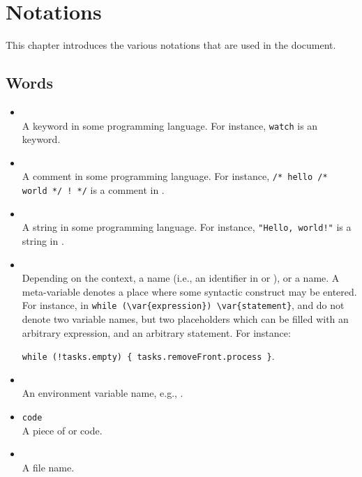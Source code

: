 
\chapter{Notations}
\label{sec:notations}

This chapter introduces the various notations that are used in the
document.

\section{Words}

\begin{itemize}
\item {}\\
  A keyword in some programming language.  For instance, \lstinline|watch|
  is an \us keyword.

\item {}\\
  A comment in some programming language.  For instance,
  \lstinline|/* hello /* world */ ! */| is a comment in \us.

\item {}\\
  A string in some programming language.  For instance,
  \lstinline|"Hello, world!"| is a string in \us.

\item {}\\
  Depending on the context, a  name (i.e., an identifier
  in \Cxx or \us), or a  name.  A meta-variable
  denotes a place where some syntactic construct may be entered.  For
  instance, in \lstinline|while (\var{expression}) \var{statement}|,
   and  do not denote two variable
  names, but two placeholders which can be filled with an arbitrary
  expression, and an arbitrary statement.  For instance:

  \lstinline|while (!tasks.empty) { tasks.removeFront.process }|.

\item {}\\
  An environment variable name, e.g., .
\item \lstinline|code|\\
  A piece of \us or \Cxx code.
\item {}\\
  A file name.
\end{itemize}

